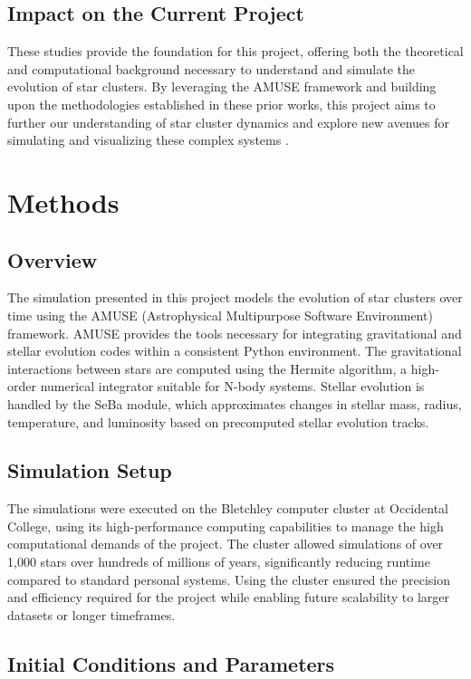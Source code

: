\documentclass[10pt,twocolumn]{article}
\begin{document}
\subsection{Impact on the Current Project}
These studies provide the foundation for this project, offering both the theoretical and computational background necessary to understand and simulate the evolution of star clusters. By leveraging the AMUSE framework and building upon the methodologies established in these prior works, this project aims to further our understanding of star cluster dynamics and explore new avenues for simulating and visualizing these complex systems \cite{portegies2018amuse}.

\section{Methods}

\subsection{ Overview}
The simulation presented in this project models the evolution of star clusters over time using the AMUSE (Astrophysical Multipurpose Software Environment) framework. AMUSE provides the tools necessary for integrating gravitational and stellar evolution codes within a consistent Python environment. The gravitational interactions between stars are computed using the Hermite algorithm, a high-order numerical integrator suitable for N-body systems. Stellar evolution is handled by the SeBa module, which approximates changes in stellar mass, radius, temperature, and luminosity based on precomputed stellar evolution tracks.

\subsection{Simulation Setup}

The simulations were executed on the Bletchley computer cluster at Occidental College, using its high-performance computing capabilities to manage the high computational demands of the project. The cluster allowed simulations of over 1,000 stars over hundreds of millions of years, significantly reducing runtime compared to standard personal systems. Using the cluster ensured the precision and efficiency required for the project while enabling future scalability to larger datasets or longer timeframes.

\subsection{Initial Conditions and Parameters}
\end{document}
